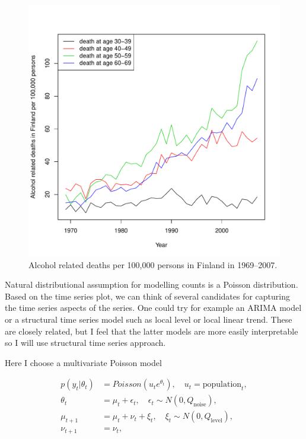 \documentclass[nojss,article]{jss}\usepackage[]{graphicx}\usepackage[]{color}
\newenvironment{knitrout}{}{} %
\begin{document}
\begin{knitrout}
\begin{figure}[!ht]
\includegraphics[width=\linewidth]{figure/alcoholPlot1} \caption[Alcohol related deaths per 100,000 persons in Finland in 1969--2007]{Alcohol related deaths per 100,000 persons in Finland in 1969--2007.\label{fig:alcoholPlot1}}
\end{figure}


\end{knitrout}

Natural distributional assumption for modelling counts is a Poisson distribution. Based on the time series plot, we can think of several candidates for capturing the time series aspects of the series. One could try for example an ARIMA model or a structural time series model such as local level or local linear trend. These are closely related, but I feel that the latter models are more easily interpretable so I will use structural time series approach.

Here I choose a multivariate Poisson model 

\begin{equation*}\label{alcohol}
\begin{aligned}
p(y_t|\theta_t) &= Poisson(u_t e^{\theta_t}), \quad u_t = \textrm{population}_t,\\
\theta_t &= \mu_t + \epsilon_t, \quad \epsilon_t \sim N(0, Q_{\textrm{noise}}),\\
\mu_{t+1} &= \mu_t + \nu_t + \xi_t, \quad \xi_t \sim N(0, Q_{\textrm{level}}), \\ 
\nu_{t+1} &= \nu_t,
\end{aligned}
\end{equation*}
\end{document}
